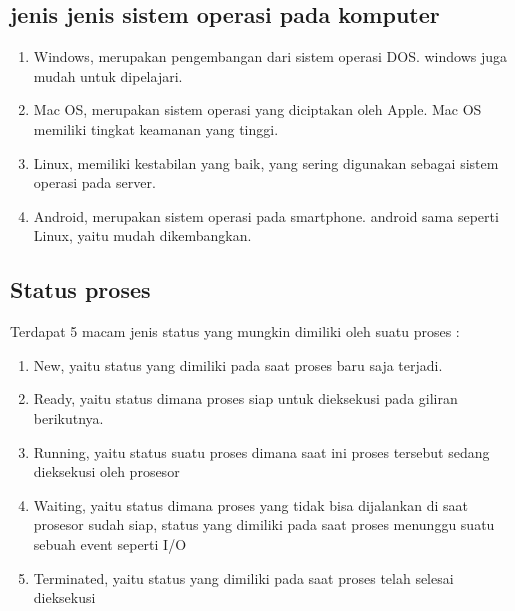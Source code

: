 		\subsection{jenis jenis sistem operasi pada komputer}
			\begin{enumerate}
				\item Windows, merupakan pengembangan dari sistem operasi DOS. windows juga mudah untuk dipelajari.
				\item Mac OS, merupakan sistem operasi yang diciptakan oleh Apple. Mac OS memiliki tingkat keamanan yang tinggi.
				\item Linux, memiliki kestabilan yang baik, yang sering digunakan sebagai sistem operasi pada server.
				\item Android, merupakan sistem operasi pada smartphone. android sama seperti Linux, yaitu mudah dikembangkan.
			\end{enumerate}
			
	\subsection{Status proses}
	Terdapat 5 macam jenis status yang mungkin dimiliki oleh suatu proses :
	\begin{enumerate}
		\item New, yaitu status yang dimiliki pada saat proses baru saja terjadi.
		\item Ready, yaitu status dimana proses siap untuk dieksekusi pada giliran berikutnya.
		\item Running, yaitu status suatu proses dimana saat ini proses tersebut sedang dieksekusi oleh prosesor
		\item Waiting, yaitu status dimana proses yang tidak bisa dijalankan di saat prosesor sudah siap, status yang dimiliki pada saat proses menunggu suatu sebuah event seperti I/O
		\item Terminated, yaitu status yang dimiliki pada saat proses telah selesai dieksekusi
	\end{enumerate}
	
